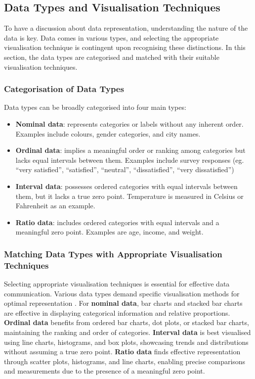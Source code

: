 \documentclass{article}\usepackage[]{graphicx}\usepackage[]{xcolor}
\begin{document}
\subsection{Data Types and Visualisation Techniques}
To have a discussion about data representation, understanding the nature of the data is key. Data comes in various types, and selecting the appropriate visualisation technique is contingent upon recognising these distinctions. In this section, the data types are categorised and matched with their suitable visualisation techniques.

\subsubsection{Categorisation of Data Types}
Data types can be broadly categorised into four main types: 
\begin{itemize}
    \item \textbf{Nominal data}: represents categories or labels without any inherent order. Examples include colours, gender categories, and city names. 
    \item \textbf{Ordinal data}: implies a meaningful order or ranking among categories but lacks equal intervals between them. Examples include survey responses (eg. “very satisfied”, “satisfied”, “neutral”, “dissatisfied”, “very dissatisfied”)
    \item \textbf{Interval data}: possesses ordered categories with equal intervals between them, but it lacks a true zero point. Temperature is measured in Celsius or Fahrenheit as an example. 
    \item \textbf{Ratio data}: includes ordered categories with equal intervals and a meaningful zero point. Examples are age, income, and weight. 
\end{itemize}

\subsubsection{Matching Data Types with Appropriate Visualisation Techniques}

Selecting appropriate visualisation techniques is essential for effective data communication. Various data types demand specific visualisation methods for optimal representation \cite{healy2018data}. For \textbf{nominal data}, bar charts and stacked bar charts are effective in displaying categorical information and relative proportions. \textbf{Ordinal data} benefits from ordered bar charts, dot plots, or stacked bar charts, maintaining the ranking and order of categories. \textbf{Interval data} is best visualised using line charts, histograms, and box plots, showcasing trends and distributions without assuming a true zero point. \textbf{Ratio data} finds effective representation through scatter plots, histograms, and line charts, enabling precise comparisons and measurements due to the presence of a meaningful zero point.
\end{document}
